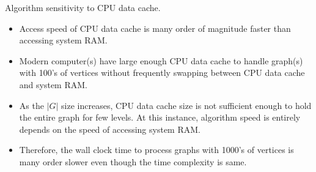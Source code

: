 \documentclass[landscape]{slides}
\begin{document}
\begin{slide}
	\begin{center}
		Algorithm sensitivity to CPU data cache.
	\end{center}
	\begin{itemize}
		\setlength{\itemsep}{0pt}
		\setlength{\parskip}{20pt}
		\setlength{\parsep}{0pt}
		\item Access speed of CPU data cache is many order of magnitude faster than accessing system RAM.
		\item Modern computer(s) have large enough CPU data cache to handle graph(s) with 100's of vertices without frequently swapping between CPU data cache and system RAM.
		\item As the $|G|$ size increases, CPU data cache size is not sufficient enough to hold the entire graph for few levels. At this instance, algorithm speed is entirely depends on the speed of accessing system RAM.
		\item Therefore, the wall clock time to process graphs with 1000's of vertices is many order slower even though the time complexity is same.
	\end{itemize}
\end{slide}
\end{document}

